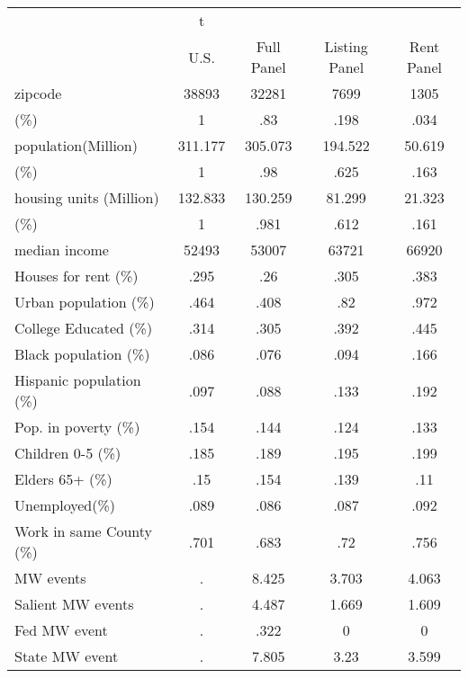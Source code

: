 \begin{tabular}{l*{4}{c}}
\hline\hline
            &           t&            &            &            \\
            &        U.S.&  Full Panel&Listing Panel&  Rent Panel\\
\hline
zipcode     &       38893&       32281&        7699&        1305\\
(\%)        &           1&         .83&        .198&        .034\\
population(Million)&     311.177&     305.073&     194.522&      50.619\\
(\%)        &           1&         .98&        .625&        .163\\
housing units (Million)&     132.833&     130.259&      81.299&      21.323\\
(\%)        &           1&        .981&        .612&        .161\\
median income&       52493&       53007&       63721&       66920\\
Houses for rent (\%)&        .295&         .26&        .305&        .383\\
Urban population (\%)&        .464&        .408&         .82&        .972\\
College Educated (\%)&        .314&        .305&        .392&        .445\\
Black population (\%)&        .086&        .076&        .094&        .166\\
Hispanic population (\%)&        .097&        .088&        .133&        .192\\
Pop. in poverty (\%)&        .154&        .144&        .124&        .133\\
Children 0-5 (\%)&        .185&        .189&        .195&        .199\\
Elders 65+ (\%)&         .15&        .154&        .139&         .11\\
Unemployed(\%)&        .089&        .086&        .087&        .092\\
Work in same County (\%)&        .701&        .683&         .72&        .756\\
MW events   &           .&       8.425&       3.703&       4.063\\
Salient MW events&           .&       4.487&       1.669&       1.609\\
Fed MW event&           .&        .322&           0&           0\\
State MW event&           .&       7.805&        3.23&       3.599\\

\end{tabular}
